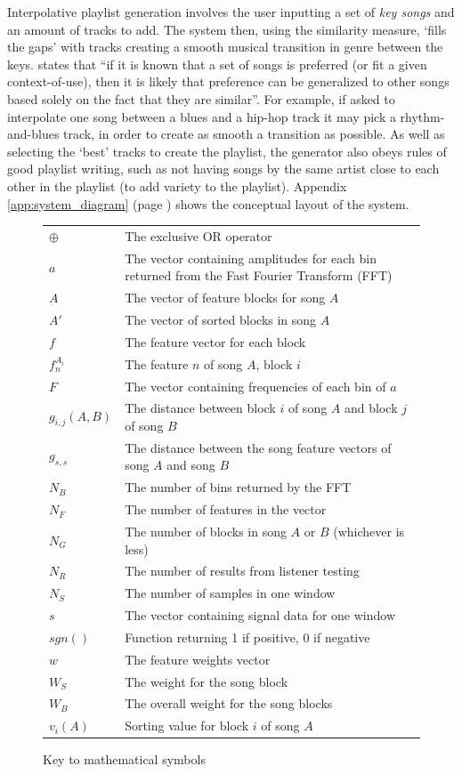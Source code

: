 Interpolative playlist generation involves the user inputting a set of \emph{key songs} and an amount of tracks to add. The system then, using the similarity measure, `fills the gaps' with tracks creating a smooth musical transition in genre between the keys. \citet{Pauws2002} states that ``if it is known that a set of songs is preferred (or fit a given context-of-use), then it is likely that preference can be generalized to other songs based solely on the fact that they are similar''. For example, if asked to interpolate one song between a blues and a hip-hop track it may pick a rhythm-and-blues track, in order to create as smooth a transition as possible. As well as selecting the `best' tracks to create the playlist, the generator also obeys rules of good playlist writing, such as not having songs by the same artist close to each other in the playlist (to add variety to the playlist). Appendix \ref{app:system_diagram} (page \pageref{app:system_diagram}) shows the conceptual layout of the system.
\begin{figure}[ht]
	\caption{Key to mathematical symbols}
	\begin{tabular}{l l}
		$\oplus$		& The exclusive OR operator \\
		$a$				& The vector containing amplitudes for each bin returned from the Fast Fourier Transform (FFT) \\
		$A$				& The vector of feature blocks for song $A$ \\
		$A'$			& The vector of sorted blocks in song $A$ \\
		$f$				& The feature vector for each block \\
		$f_n^{A_{i}}$	& The feature $n$ of song $A$, block $i$ \\
		$F$				& The vector containing frequencies of each bin of $a$ \\
		$g_{i,j}(A,B)$	& The distance between block $i$ of song $A$ and block $j$ of song $B$ \\
		$g_{s,s}$		& The distance between the song feature vectors of song $A$ and song $B$ \\
		$N_B$			& The number of bins returned by the FFT \\
		$N_F$			& The number of features in the vector \\
		$N_G$			& The number of blocks in song $A$ or $B$ (whichever is less) \\
		$N_R$			& The number of results from listener testing \\
		$N_S$			& The number of samples in one window \\
		$s$				& The vector containing signal data for one window \\
		$sgn()$			& Function returning 1 if positive, 0 if negative \\
		$w$				& The feature weights vector \\
		$W_S$			& The weight for the song block \\
		$W_B$			& The overall weight for the song blocks \\
		$v_i(A)$		& Sorting value for block $i$ of song $A$ \\
	\end{tabular}
\end{figure}
